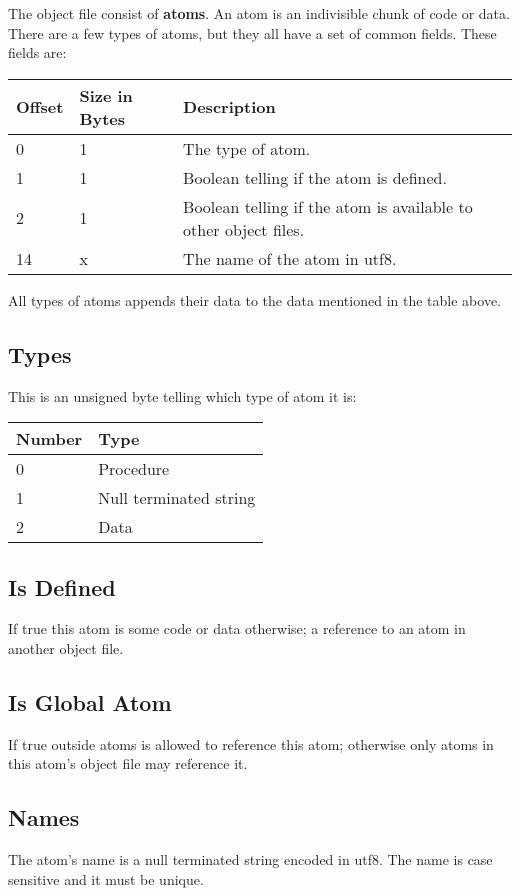 The object file consist of \textbf{atoms}. An atom is an indivisible chunk of
code or data. There are a few types of atoms, but they all have a set of common
fields. These fields are:

\begin{table}[h]
    \centering
    \label{tbl:atom}
    \begin{tabular}{|l|l|l|}
        \hline
        \textbf{Offset} & \textbf{Size in Bytes} & \textbf{Description}                                            \\ \hline
        0               & 1                      & The type of atom.                                               \\ \hline
        1               & 1                      & Boolean telling if the atom is defined.                         \\ \hline
        2               & 1                      & Boolean telling if the atom is available to other object files. \\ \hline
        14              & x                      & The name of the atom in utf8.                                   \\ \hline
    \end{tabular}
\end{table}

All types of atoms appends their data to the data mentioned in the table above.

\subsection{Types}
This is an unsigned byte telling which type of atom it is:

\begin{table}[h]
    \centering
    \label{tbl:type}
    \begin{tabular}{|l|l|}
        \hline
        \textbf{Number} & \textbf{Type}          \\ \hline
        0               & Procedure              \\ \hline
        1               & Null terminated string \\ \hline
        2               & Data                   \\ \hline
    \end{tabular}
\end{table}

\subsection{Is Defined}
If true this atom is some code or data otherwise; a reference to an atom in 
another object file.

\subsection{Is Global Atom}
If true outside atoms is allowed to reference this atom; otherwise only atoms in
this atom's object file may reference it.

\subsection{Names}
The atom's name is a null terminated string encoded in utf8. The name is case 
sensitive and it must be unique.